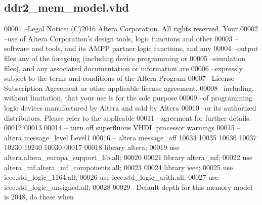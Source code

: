 \subsection{ddr2\+\_\+mem\+\_\+model.\+vhd}
\label{ddr2__mem__model_8vhd_source}

\begin{DoxyCode}
00001 \textcolor{keyword}{--Legal Notice: (C)2016 Altera Corporation. All rights reserved.  Your}
00002 \textcolor{keyword}{--use of Altera Corporation's design tools, logic functions and other}
00003 \textcolor{keyword}{--software and tools, and its AMPP partner logic functions, and any}
00004 \textcolor{keyword}{--output files any of the foregoing (including device programming or}
00005 \textcolor{keyword}{--simulation files), and any associated documentation or information are}
00006 \textcolor{keyword}{--expressly subject to the terms and conditions of the Altera Program}
00007 \textcolor{keyword}{--License Subscription Agreement or other applicable license agreement,}
00008 \textcolor{keyword}{--including, without limitation, that your use is for the sole purpose}
00009 \textcolor{keyword}{--of programming logic devices manufactured by Altera and sold by Altera}
00010 \textcolor{keyword}{--or its authorized distributors.  Please refer to the applicable}
00011 \textcolor{keyword}{--agreement for further details.}
00012 
00013 
00014 \textcolor{keyword}{-- turn off superfluous VHDL processor warnings }
00015 \textcolor{keyword}{-- altera message\_level Level1 }
00016 \textcolor{keyword}{-- altera message\_off 10034 10035 10036 10037 10230 10240 10030 }
00017 
00018 \textcolor{vhdlkeyword}{library }\textcolor{keywordflow}{altera};
00019 \textcolor{vhdlkeyword}{use }altera.altera\_europa\_support\_lib.\textcolor{keywordflow}{all};
00020 
00021 \textcolor{vhdlkeyword}{library }\textcolor{keywordflow}{altera\_mf};
00022 \textcolor{vhdlkeyword}{use }altera_mf.altera\_mf\_components.\textcolor{keywordflow}{all};
00023 
00024 \textcolor{vhdlkeyword}{library }\textcolor{keywordflow}{ieee};
00025 \textcolor{vhdlkeyword}{use }ieee.std\_logic\_1164.\textcolor{keywordflow}{all};
00026 \textcolor{vhdlkeyword}{use }ieee.std\_logic\_arith.\textcolor{keywordflow}{all};
00027 \textcolor{vhdlkeyword}{use }ieee.std\_logic\_unsigned.\textcolor{keywordflow}{all};
00028 
00029 \textcolor{keyword}{--Default depth for this memory model is 2048, do these when}

\end{DoxyCode}
